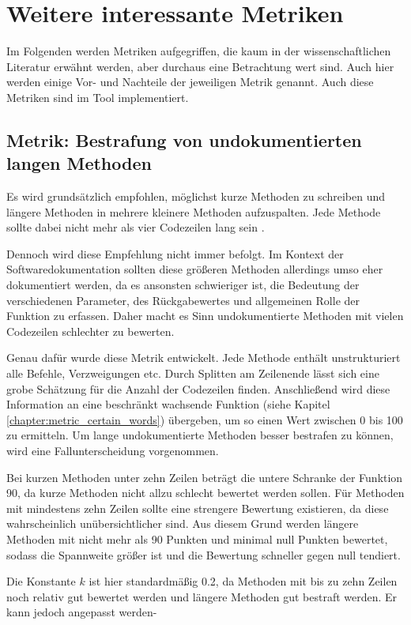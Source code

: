  \section{Weitere interessante Metriken}
 Im Folgenden werden Metriken aufgegriffen, die kaum in der wissenschaftlichen Literatur erwähnt werden, aber durchaus eine Betrachtung wert sind. Auch hier werden einige Vor- und Nachteile der jeweiligen Metrik genannt. Auch diese Metriken sind im Tool implementiert. 
 \subsection{Metrik: Bestrafung von undokumentierten langen Methoden}\label{chapter:metric_method_long}
Es wird grundsätzlich empfohlen, möglichst kurze Methoden zu schreiben und längere Methoden in mehrere kleinere Methoden aufzuspalten. Jede Methode sollte dabei nicht mehr als vier Codezeilen lang sein \cite[S. 34]{martin2009clean}.
 
 Dennoch wird diese Empfehlung nicht immer befolgt. Im Kontext der Softwaredokumentation sollten diese größeren Methoden allerdings umso eher dokumentiert werden, da es ansonsten schwieriger ist, die Bedeutung der verschiedenen Parameter, des Rückgabewertes und allgemeinen Rolle der Funktion zu erfassen. Daher macht es Sinn undokumentierte Methoden mit vielen Codezeilen schlechter zu bewerten.
 
 Genau dafür wurde diese Metrik entwickelt. Jede Methode enthält unstrukturiert alle Befehle, Verzweigungen etc. Durch Splitten am Zeilenende lässt sich eine grobe Schätzung für die Anzahl der Codezeilen finden. Anschließend wird diese Information an eine beschränkt wachsende Funktion (siehe Kapitel \ref{chapter:metric_certain_words}) übergeben, um so einen Wert zwischen 0 bis 100 zu ermitteln. 
  Um lange undokumentierte Methoden besser bestrafen zu können, wird eine Fallunterscheidung vorgenommen.
 
 Bei kurzen Methoden unter zehn Zeilen beträgt die untere Schranke der Funktion 90, da kurze Methoden nicht allzu schlecht bewertet werden sollen. Für Methoden mit mindestens zehn Zeilen sollte eine strengere Bewertung existieren, da diese wahrscheinlich unübersichtlicher sind. Aus diesem Grund werden längere Methoden mit nicht mehr als 90 Punkten und minimal null Punkten bewertet, sodass die Spannweite größer ist und die Bewertung schneller gegen null tendiert.
 
 Die Konstante $k$ ist hier standardmäßig  0.2, da Methoden mit bis zu zehn Zeilen noch relativ gut bewertet werden und längere Methoden gut bestraft werden. Er kann jedoch angepasst werden-
 
